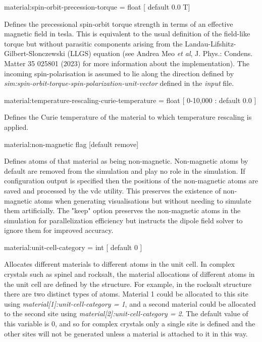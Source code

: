 {\zicf material:spin-orbit-precession-torque = float [ default 0.0 T]}
Defines the precessional spin-orbit torque strength in terms of an effective
magnetic field in tesla. This is equivalent to the usual definition of the
field-like torque but without parasitic components arising from the
Landau-Lifshitz-Gilbert-Slonczewski (LLGS) equation (see Andrea Meo
\textit{et al}, J. Phys.: Condens. Matter 35 025801 (2023) for more information
about the implementation). The incoming spin-polarisation is assumed to lie
along the direction defined by \textit{sim:spin-orbit-torque-spin-polarization-unit-vector}
defined in the \textit{input} file.

{\zicf material:temperature-rescaling-curie-temperature = float [ 0-10,000 : default 0.0 ]}
Defines the Curie temperature of the material to which temperature rescaling is
applied.

{\zicf material:non-magnetic flag [default remove]}
Defines atoms of that material as being non-magnetic. Non-magnetic atoms by
default are removed from the simulation and play no role in the simulation. If
configuration output is specified then the positions of the non-magnetic atoms
are saved and processed by the vdc utility. This preserves the existence of
non-magnetic atoms when generating visualisations but without needing to
simulate them artificially. The "keep" option preserves the non-magnetic atoms
in the simulation for parallelization efficiency but instructs the dipole field
solver to ignore them for improved accuracy.


{\zicf material:unit-cell-category = int [ default 0 ]}
Allocates different materials to different atoms in the unit cell. In complex
crystals such as spinel and rocksalt, the material allocations of
different atoms in the unit cell are defined by the structure. For example, in
the rocksalt structure there are two distinct types of atoms. Material 1 could
be allocated to this site using \textit{material[1]:unit-cell-category = 1},
and a second material could be allocated to the second site using
\textit{material[2]:unit-cell-category = 2}. The default value of this
variable is 0, and so for complex crystals only a single site is defined and
the other sites will not be generated unless a material is attached to it in
this way.

